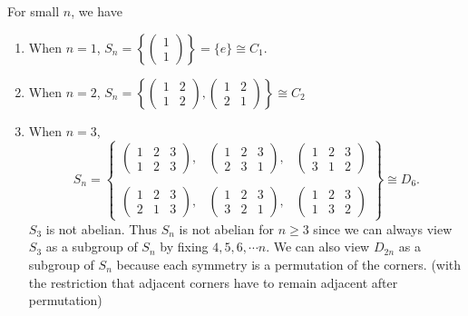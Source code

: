 \documentclass[a4paper]{article}
\begin{document}
  \begin{eg}
    For small $n$, we have
    \begin{enumerate}
      \item When $n = 1$, $S_n = \left\{\begin{pmatrix}1\\1\end{pmatrix}\right\} = \{e\}\cong C_1$.
      \item When $n = 2$, $S_n = \left\{\begin{pmatrix}1 & 2\\ 1 & 2\end{pmatrix}, \begin{pmatrix}1 & 2\\2 & 1\end{pmatrix}\right\}\cong C_2$
      \item When $n = 3$,
        \[
          S_n = \left\{\begin{matrix}\begin{pmatrix}1 & 2 & 3\\1 & 2 & 3\end{pmatrix}, &\begin{pmatrix}1 & 2 & 3\\ 2 & 3 & 1\end{pmatrix}, &\begin{pmatrix}1 & 2 & 3\\3 & 1 & 2\end{pmatrix}\\\\\begin{pmatrix}1 & 2 & 3\\2 & 1 & 3\end{pmatrix}, &\begin{pmatrix}1 & 2 & 3\\ 3 & 2 & 1\end{pmatrix}, &\begin{pmatrix}1 & 2 & 3\\1 & 3 & 2\end{pmatrix}\end{matrix}\right\}\cong D_6.
        \]
        \note $S_3$ is not abelian. Thus $S_n$ is not abelian for $n \geq 3$ since we can always view $S_3$ as a subgroup of $S_n$ by fixing $4, 5, 6, \cdots n$.
        \note We can also view $D_{2n}$ as a subgroup of $S_n$ because each symmetry is a permutation of the corners. (with the restriction that adjacent corners have to remain adjacent after permutation)
    \end{enumerate}
  \end{eg}
\end{document}
